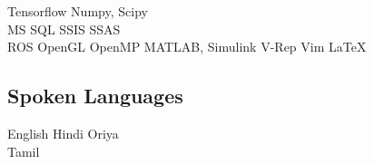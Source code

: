 \documentclass[]{deedy-resume-openfont}
\begin{document}
\begin{minipage}[t]{0.33\textwidth}
Tensorflow \textbullet{}Numpy, Scipy  \\ 
MS SQL \textbullet{} SSIS \textbullet{} SSAS \\
ROS \textbullet{}  OpenGL \textbullet{} OpenMP 
MATLAB, Simulink \textbullet{}
V-Rep \textbullet{} Vim \textbullet{} \LaTeX 

\sectionsep

\subsection{Spoken Languages}
English \textbullet{} Hindi \textbullet{} Oriya \\
Tamil

%
%

\end{minipage} 
\hfill
\end{document}

